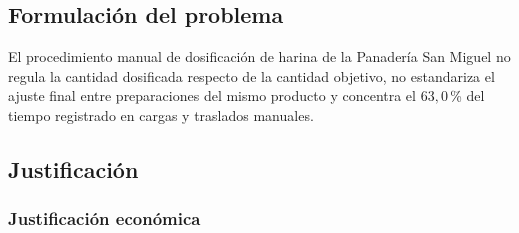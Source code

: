 
\subsection{Formulación del problema}
\label{subsec:formulacion_problema}


El procedimiento manual de dosificación de harina de la Panadería San
Miguel no regula la cantidad dosificada respecto de la cantidad objetivo,
no estandariza el ajuste final entre preparaciones del mismo producto y
concentra el $63{,}0$\,\% del tiempo registrado en cargas y traslados
manuales.

\subsection{Justificación}
\label{sec:justificacion}


\subsubsection{Justificación económica}
\label{subsec:justificacion_economica}

